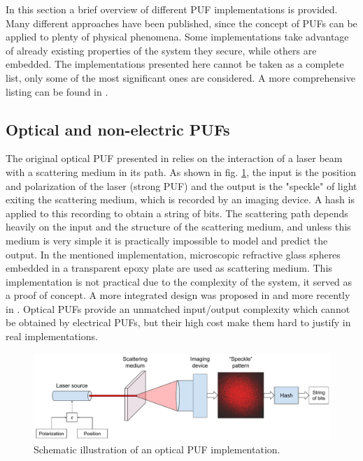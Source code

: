 In this section a brief overview of different PUF implementations is provided. Many different approaches have been published, since the concept of PUFs can be applied to plenty of physical phenomena. Some implementations take advantage of already existing properties of the system they secure, while others are embedded. The implementations presented here cannot be taken as a complete list, only some of the most significant ones are considered. A more comprehensive listing can be found in \cite{McGrath2019,Maes2010}. 

\subsection{Optical and non-electric PUFs}

 The original optical PUF presented in \cite{Pappu2002} relies on the interaction of a laser beam with a scattering medium in its path. As shown in fig. \ref{fig:opticalpuf}, the input is the position and polarization of the laser (strong PUF) and the output is the "speckle" of light exiting the scattering medium, which is recorded by an imaging device. A hash is applied to this recording to obtain a string of bits. The scattering path depends heavily on the input and the structure of the scattering medium, and unless this medium is very simple it is practically impossible to model and predict the output. In the mentioned implementation, microscopic refractive glass spheres embedded in a transparent epoxy plate are used as scattering medium. This implementation is not practical due to the complexity of the system, it served as a proof of concept. A more integrated design was proposed in \cite{Tuylsoptic} and more recently in \cite{Rhrmair2013OpticalPR}. Optical PUFs provide an unmatched input/output complexity which cannot be obtained by electrical PUFs, but their high cost make them hard to justify in real implementations. 
 
 \begin{figure}[H]
    \centering
    \includegraphics[width=15cm]{images/Optical PUF.pdf}
    \caption{Schematic illustration of an optical PUF implementation.}
    \label{fig:opticalpuf}
\end{figure}

